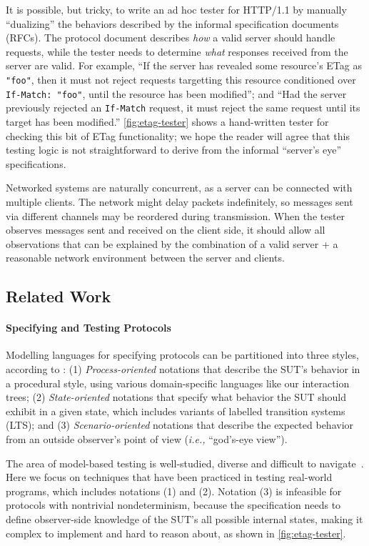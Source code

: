 \documentclass{article}
\newcommand{\http}{HTTP/1.1\xspace}
\newcommand{\inlinec}[1]{\lstinline[style=customc]{#1}}
\theoremstyle{definition}
\begin{document}
It is possible, but tricky, to write an ad hoc tester for \http by manually
``dualizing'' the behaviors described by the informal specification documents
(RFCs).  The protocol document describes {\em how} a valid server should handle
requests, while the tester needs to determine {\em what} responses received from
the server are valid.  For example, ``If the server has revealed some resource's
ETag as \inlinec{"foo"}, then it must not reject requests targetting this
resource conditioned over \inlinec{If-Match: "foo"}, until the resource has been
modified''; and ``Had the server previously rejected an \inlinec{If-Match}
request, it must reject the same request until its target has been modified.''
\autoref{fig:etag-tester} shows a hand-written tester for checking this bit of
ETag functionality; we hope the reader will agree that this testing logic is not
straightforward to derive from the informal ``server's eye'' specifications.

Networked systems are naturally concurrent, as a server can be connected with
multiple clients.  The network might delay packets indefinitely, so messages
sent via different channels may be reordered during transmission.  When the
tester observes messages sent and received on the client side, it should allow
all observations that can be explained by the combination of a valid server + a
reasonable network environment between the server and clients.

\subsection{Related Work}
\label{sec:related-work}

\paragraph{Specifying and Testing Protocols}
Modelling languages for specifying protocols can be partitioned into three
styles, according to \textcite{anand2013orchestrated}: (1) {\em Process-oriented}
notations that describe the SUT's behavior in a procedural style, using various
domain-specific languages like our interaction trees; (2) {\em State-oriented}
notations that specify what behavior the SUT should exhibit in a given state,
which includes variants of labelled transition systems (LTS); and (3) {\em
  Scenario-oriented} notations that describe the expected behavior from an
outside observer's point of view ({\it i.e.,} ``god's-eye view'').

The area of model-based testing is well-studied, diverse and difficult to
navigate~\cite{anand2013orchestrated}.  Here we focus on techniques that have
been practiced in testing real-world programs, which includes notations (1) and
(2).  Notation (3) is infeasible for protocols with nontrivial nondeterminism,
because the specification needs to define observer-side knowledge of the SUT's
all possible internal states, making it complex to implement and hard to reason
about, as shown in \autoref{fig:etag-tester}.
\end{document}
